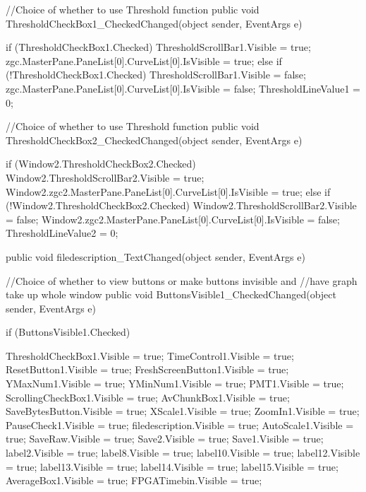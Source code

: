 {{        //Choice of whether to use Threshold function
        public void ThresholdCheckBox1_CheckedChanged(object sender, EventArgs e)
        {
            if (ThresholdCheckBox1.Checked)
            {
                ThresholdScrollBar1.Visible = true;
                zgc.MasterPane.PaneList[0].CurveList[0].IsVisible = true;
            }
            else if (!ThresholdCheckBox1.Checked)
            {
                ThresholdScrollBar1.Visible = false;
                zgc.MasterPane.PaneList[0].CurveList[0].IsVisible = false;
                ThresholdLineValue1 = 0;
            }

        }

        //Choice of whether to use Threshold function
        public void ThresholdCheckBox2_CheckedChanged(object sender, EventArgs e)
        {
            if (Window2.ThresholdCheckBox2.Checked)
            {
                Window2.ThresholdScrollBar2.Visible = true;
                Window2.zgc2.MasterPane.PaneList[0].CurveList[0].IsVisible = true;
            }
            else if (!Window2.ThresholdCheckBox2.Checked)
            {
                Window2.ThresholdScrollBar2.Visible = false;
                Window2.zgc2.MasterPane.PaneList[0].CurveList[0].IsVisible = false;
                ThresholdLineValue2 = 0;
            }

        }

        public void filedescription_TextChanged(object sender, EventArgs e)
        {

        }
       
        //Choice of whether to view buttons or make buttons invisible and 
        //have graph take up whole window
        public void ButtonsVisible1_CheckedChanged(object sender, EventArgs e)
        {
            if (ButtonsVisible1.Checked)
            {
                ThresholdCheckBox1.Visible = true;
                TimeControl1.Visible = true;
                ResetButton1.Visible = true;
                FreshScreenButton1.Visible = true;
                YMaxNum1.Visible = true;
                YMinNum1.Visible = true;
                PMT1.Visible = true;
                ScrollingCheckBox1.Visible = true;
                AvChunkBox1.Visible = true;
                SaveBytesButton.Visible = true;
                XScale1.Visible = true;
                ZoomIn1.Visible = true;
                PauseCheck1.Visible = true;
                filedescription.Visible = true;
                AutoScale1.Visible = true;
                SaveRaw.Visible = true;
                Save2.Visible = true;
                Save1.Visible = true;
                label2.Visible = true;
                label8.Visible = true;
                label10.Visible = true;
                label12.Visible = true;
                label13.Visible = true;
                label14.Visible = true;
                label15.Visible = true;
                AverageBox1.Visible = true;
                FPGATimebin.Visible = true;

}}}}

